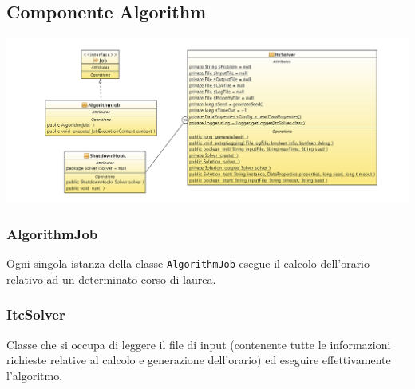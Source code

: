 \documentclass[11pt,a4paper]{article}
\begin{document}
\subsection{Componente Algorithm}
\includegraphics[scale=0.34]{images/MMalg_diagram_class.png}
\subsubsection{AlgorithmJob}
Ogni singola istanza della classe \verb|AlgorithmJob| esegue il calcolo dell'orario relativo ad un determinato corso di laurea.
\subsubsection{ItcSolver}
Classe che si occupa di leggere il file di input (contenente tutte le informazioni richieste relative al calcolo e generazione dell'orario) ed eseguire effettivamente l'algoritmo.
\newpage
\end{document}
